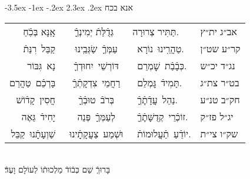 \documentclass[12pt,letterpaper]{siddur}
\makeatletter
\renewcommand\section{\setcounter{mishnah}{0}\@startsection {section}{1}{\z@}%
                                   {-3.5ex \@plus -1ex \@minus -.2ex}%
                                   {2.3ex \@plus.2ex}%
                                   {\normalfont\large}}
\makeatother
\begin{document}
\section{אנא בכח}
\begin{tabular}{r c l l}
אָֽנָּא בְּכֹֽֿחַ & גְּדֻֿלַּתֿ יְמִינְךָֿ & תַּתִּיר צְרוּרָה. &\hspace{2em} אב״ג ית״ץ\\
קַבֵּל רִנַּתֿ & עַמְּךָֿ שַׂגְּבֵֽינוּ & טַהֲרֵֽינוּ נוֹרָא. & קר״ע שט״ן\\
נָא גִּבּוֹר & דּוֹרְשֵׁי יִחוּדְךָֿ & כְּבָֿבַֿת שׇׁמְרֵם. & נג״ד יכ״ש\\
בָּרְכֵֿם טַהֲרֵם & רַחֲמֵי צִדְקָתְֿךָֿ & תָּמִידֿ גׇּמְלֵם. & בט״ר צת״ג\\
חֲסִין קָדֿוֹשׁ & בְּרֺבֿ טוּבְֿךָֿ & נַהֵל עֲדָֿתֶֽֿךָֿ. & חק״ב טנ״ע\\
יָחִידֿ גֵּאֶה & לְעַמְּךָֿ פְּנֵה & זוֹכְֿרֵי קְדֻשָּׁתֶֽֿךָֿ. & יג״ל פז״ק\\
שַׁוְעָתֵֽֿנוּ קַבֵּל & וּשְׁמַע צַעֲקָתֵֽֿינוּ & יוֹדֵֿעַ תַֿעֲלוּמוֹתֿ. & שק״ו צי״ת

\end{tabular}\\
\hbox{}\hspace{1ex}
בָּרוּךְֿ שֵׁם כְּבֿוֹדֿ מַלְכוּתֿוֹ לְעוֹלָם וָעֶדֿ׃
\end{document}
